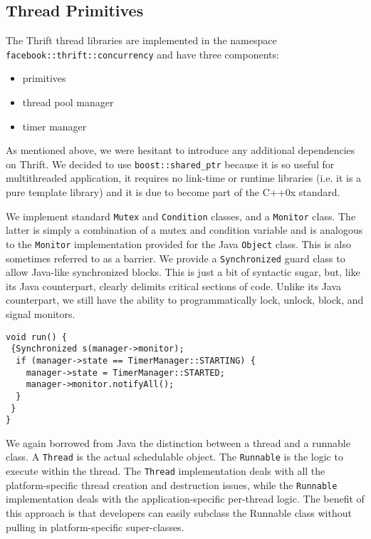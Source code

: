 \documentclass[nocopyrightspace,blockstyle]{sigplanconf}
\begin{document}
\subsection{Thread Primitives}

The Thrift thread libraries are implemented in the namespace\\
\texttt{facebook::thrift::concurrency} and have three components:
\begin{itemize}
\item primitives
\item thread pool manager
\item timer manager
\end{itemize}

As mentioned above, we were hesitant to introduce any additional dependencies
on Thrift. We decided to use \texttt{boost::shared\_ptr} because it is so
useful for multithreaded application, it requires no link-time or
runtime libraries (i.e. it is a pure template library) and it is due
to become part of the C++0x standard.

We implement standard \texttt{Mutex} and \texttt{Condition} classes, and a
 \texttt{Monitor} class. The latter is simply a combination of a mutex and
condition variable and is analogous to the \texttt{Monitor} implementation provided for
the Java \texttt{Object} class. This is also sometimes referred to as a barrier. We
provide a \texttt{Synchronized} guard class to allow Java-like synchronized blocks.
This is just a bit of syntactic sugar, but, like its Java counterpart, clearly
delimits critical sections of code. Unlike its Java counterpart, we still
have the ability to programmatically lock, unlock, block, and signal monitors.

\begin{verbatim}
void run() {
 {Synchronized s(manager->monitor);
  if (manager->state == TimerManager::STARTING) {
    manager->state = TimerManager::STARTED;
    manager->monitor.notifyAll();
  }
 }
}
\end{verbatim}

We again borrowed from Java the distinction between a thread and a runnable
class. A \texttt{Thread} is the actual schedulable object. The
\texttt{Runnable} is the logic to execute within the thread.
The \texttt{Thread} implementation deals with all the platform-specific thread
creation and destruction issues, while the \texttt{Runnable} implementation deals
with the application-specific per-thread logic. The benefit of this approach
is that developers can easily subclass the Runnable class without pulling in
platform-specific super-classes.
\end{document}
